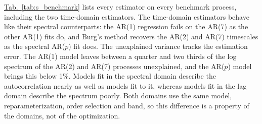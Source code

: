 \documentclass[pdflatex,lineno,sn-nature]{sn-jnl}
\newcommand{\tabpanel}[2][]{\hyperref[#2]{Tab.~#1\ref*{#2}}}
\theoremstyle{thmstyleone}
\theoremstyle{thmstyletwo}
\theoremstyle{thmstylethree}
\begin{document}
\tabpanel{tab:s_benchmark} lists every estimator on every benchmark process, including the two time-domain estimators. The time-domain estimators behave like their spectral counterparts: the AR(1) regression fails on the AR(7) as the other AR(1) fits do, and Burg's method recovers the AR(2) and AR(7) timescales as the spectral AR($p$) fit does. The unexplained variance tracks the estimation error. The AR(1) model leaves between a quarter and two thirds of the log spectrum of the AR(2) and AR(7) processes unexplained, and the AR($p$) model brings this below 1\%. Models fit in the spectral domain describe the autocorrelation nearly as well as models fit to it, whereas models fit in the lag domain describe the spectrum poorly. Both domains use the same model, reparameterization, order selection and band, so this difference is a property of the domains, not of the optimization.
\end{document}
